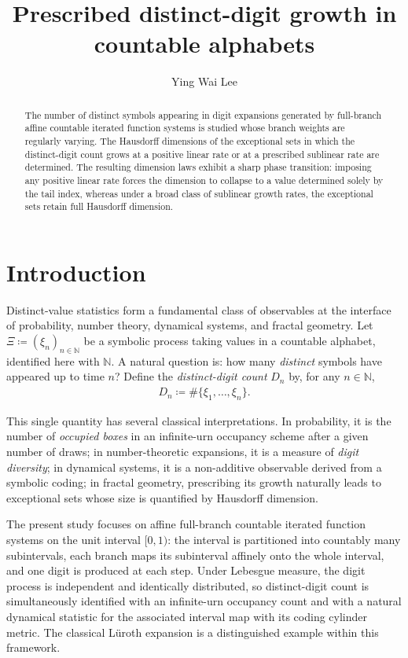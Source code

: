 \documentclass[12pt,reqno]{amsart}
\title{Prescribed distinct-digit growth in countable alphabets}
\author{Ying Wai Lee}
\theoremstyle{definition}
\theoremstyle{plain}
\begin{document}
\begin{abstract}
    The number of distinct symbols appearing in digit expansions generated by full-branch affine countable iterated function systems is studied whose branch weights are regularly varying. The Hausdorff dimensions of the exceptional sets in which the distinct-digit count grows at a positive linear rate or at a prescribed sublinear rate are determined. The resulting dimension laws exhibit a sharp phase transition: imposing any positive linear rate forces the dimension to collapse to a value determined solely by the tail index, whereas under a broad class of sublinear growth rates, the exceptional sets retain full Hausdorff dimension.
\end{abstract}

\maketitle

\section{Introduction}

Distinct-value statistics form a fundamental class of observables at the interface of probability, number theory, dynamical systems, and fractal geometry. Let $\Xi\coloneqq(\xi_n)_{n\in\mathbb{N}}$ be a symbolic process taking values in a countable alphabet, identified here with $\mathbb{N}$. A natural question is: how many \emph{distinct} symbols have appeared up to time $n$? Define the \emph{distinct-digit count} $D_n$ by, for any $n\in\mathbb{N}$,
\begin{align*}
    D_n\coloneqq \#\{\xi_1,\ldots,\xi_n\}.
\end{align*}

This single quantity has several classical interpretations. In probability, it is the number of \emph{occupied boxes} in an infinite-urn occupancy scheme after a given number of draws; in number-theoretic expansions, it is a measure of \textit{digit diversity}; in dynamical systems, it is a non-additive observable derived from a symbolic coding; in fractal geometry, prescribing its growth naturally leads to exceptional sets whose size is quantified by Hausdorff dimension.

The present study focuses on affine full-branch countable iterated function systems on the unit interval $[0,1)$: the interval is partitioned into countably many subintervals, each branch maps its subinterval affinely onto the whole interval, and one digit is produced at each step. Under Lebesgue measure, the digit process is independent and identically distributed, so distinct-digit count is simultaneously identified with an infinite-urn occupancy count and with a natural dynamical statistic for the associated interval map with its coding cylinder metric. The classical L\"uroth expansion is a distinguished example within this framework.
\end{document}
